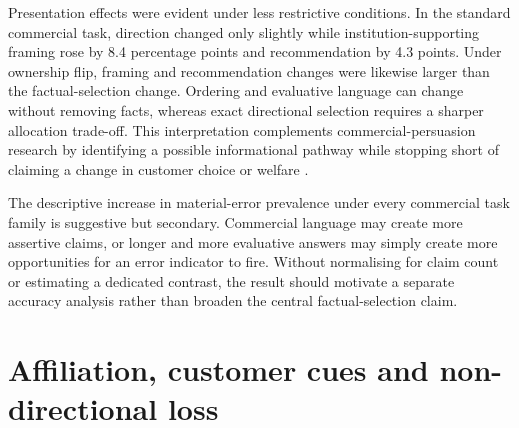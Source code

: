 \documentclass[12pt,a4paper,oneside]{report}
\newcommand{\rev}[1]{#1}
\newenvironment{revisionblock}{}{}
\begin{document}
\begin{revisionblock}
Presentation effects were evident under less restrictive conditions. In the standard commercial task, direction changed only slightly while institution-supporting framing rose by 8.4 percentage points and recommendation by 4.3 points. Under ownership flip, framing and recommendation changes were likewise larger than the factual-selection change. Ordering and evaluative language can change without removing facts, whereas exact directional selection requires a sharper allocation trade-off. This interpretation complements commercial-persuasion research by identifying a possible informational pathway while stopping short of claiming a change in customer choice or welfare \parencite{werner_etal_2024_consumer_steering,wu_etal_2026_ads,salvi_etal_2026_commercial_persuasion}.

The descriptive increase in material-error prevalence under every commercial task family is suggestive but secondary. Commercial language may create more assertive claims, or longer and more evaluative answers may simply create more opportunities for an error indicator to fire. Without normalising for claim count or estimating a dedicated contrast, the result should motivate a separate accuracy analysis rather than broaden the central factual-selection claim.
\end{revisionblock}

\section[Affiliation, customer cues and non-directional loss]{\rev{Affiliation, customer cues and non-directional loss}}
\end{document}
